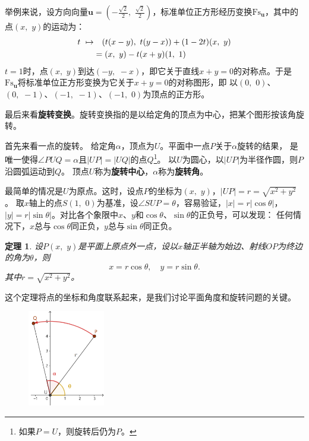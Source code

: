 \documentclass[12pt,UTF8]{ctexbook}
\newtheorem{tm}{定理}[section]
\begin{document}
举例来说，设方向向量$\mathbf{u} = \left(-\frac{\sqrt{2}}{2},\,\,\frac{\sqrt{2}}{2}\right)$，标准单位正方形经历变换$\mathrm{Fs}_\mathbf{u}$，其中的点$(x,\,\,y)$的运动为：
\begin{align}
    t \,\, \mapsto &\quad (t(x-y), \,\,t(y-x)) + (1 - 2t)(x, \,\,y) \notag \\
    & = (x, \,\,y) - t(x+y)(1, \,\, 1) \notag
\end{align}
$t=1$时，点$(x,\,\,y)$到达$(-y,\,\,-x)$，即它关于直线$x+y=0$的对称点。于是$\mathrm{Fs}_\mathbf{u}$将标准单位正方形变换为它关于$x+y=0$的对称图形，即
以$(0,\,\,0)$、$(0,\,\,-1)$、$(-1,\,\,-1)$、$(-1,\,\,0)$为顶点的正方形。

最后来看\textbf{旋转变换}。旋转变换指的是以给定角的顶点为中心，把某个图形按该角旋转。

首先来看一点的旋转。
给定角$\alpha$，顶点为$U$。平面中一点$P$关于$\alpha$旋转的结果，
是唯一使得$\angle PUQ = \alpha$且$|UP| = |UQ|$的点$Q$\footnote{如果$P=U$，则旋转后仍为$P$。}。
以$U$为圆心，以$|UP|$为半径作圆，则$P$沿圆弧运动到$Q$。
顶点$U$称为\textbf{旋转中心}，$\alpha$称为\textbf{旋转角}。

最简单的情况是$U$为原点。这时，设点$P$的坐标为$(x,\,\,y)$，$|UP| = r = \sqrt{x^2 + y^2}$。
取$x$轴上的点$S(1,\,\,0)$为基准，设$\angle SUP = \theta$，容易验证，$|x| = r|\cos{\theta}|$，
$|y| = r|\sin{\theta}|$。对比各个象限中$x$、$y$和$\cos{\theta}$、$\sin{\theta}$的正负号，可以发现：
任何情况下，$x$总与$\cos{\theta}$同正负，$y$总与$\sin{\theta}$同正负。

\begin{tm}
    设$P(x,\,\,y)$是平面上原点外一点，设以$x$轴正半轴为始边、射线$OP$为终边的角为$\theta$，则
    $$ x = r\cos{\theta},\quad y = r\sin{\theta}.$$
    其中$r = \sqrt{x^2 + y^2}$。
\end{tm}
这个定理将点的坐标和角度联系起来，是我们讨论平面角度和旋转问题的关键。 

\begin{figure} %
    \vspace{-40pt}
    \flushright
    \includegraphics[width=0.3\textwidth]{旋转变换例1.png}
\end{figure}
\end{document}
